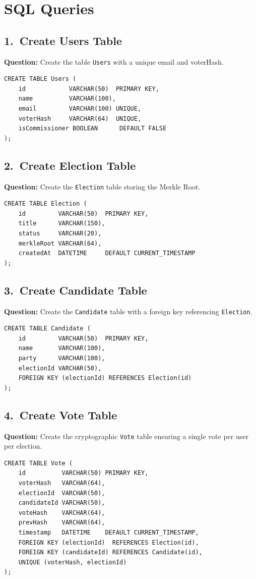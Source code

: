 \documentclass[12pt, a4paper]{article}
\begin{document}
\section{SQL Queries}

\subsection{1.\ Create Users Table}
\textbf{Question:} Create the table \texttt{Users} with a unique email and voterHash.
\begin{lstlisting}
CREATE TABLE Users (
    id            VARCHAR(50)  PRIMARY KEY,
    name          VARCHAR(100),
    email         VARCHAR(100) UNIQUE,
    voterHash     VARCHAR(64)  UNIQUE,
    isCommissioner BOOLEAN      DEFAULT FALSE
);
\end{lstlisting}

\subsection{2.\ Create Election Table}
\textbf{Question:} Create the \texttt{Election} table storing the Merkle Root.
\begin{lstlisting}
CREATE TABLE Election (
    id         VARCHAR(50)  PRIMARY KEY,
    title      VARCHAR(150),
    status     VARCHAR(20),
    merkleRoot VARCHAR(64),
    createdAt  DATETIME     DEFAULT CURRENT_TIMESTAMP
);
\end{lstlisting}

\subsection{3.\ Create Candidate Table}
\textbf{Question:} Create the \texttt{Candidate} table with a foreign key referencing \texttt{Election}.
\begin{lstlisting}
CREATE TABLE Candidate (
    id         VARCHAR(50)  PRIMARY KEY,
    name       VARCHAR(100),
    party      VARCHAR(100),
    electionId VARCHAR(50),
    FOREIGN KEY (electionId) REFERENCES Election(id)
);
\end{lstlisting}

\subsection{4.\ Create Vote Table}
\textbf{Question:} Create the cryptographic \texttt{Vote} table ensuring a single vote per user per election.
\begin{lstlisting}
CREATE TABLE Vote (
    id          VARCHAR(50) PRIMARY KEY,
    voterHash   VARCHAR(64),
    electionId  VARCHAR(50),
    candidateId VARCHAR(50),
    voteHash    VARCHAR(64),
    prevHash    VARCHAR(64),
    timestamp   DATETIME    DEFAULT CURRENT_TIMESTAMP,
    FOREIGN KEY (electionId)  REFERENCES Election(id),
    FOREIGN KEY (candidateId) REFERENCES Candidate(id),
    UNIQUE (voterHash, electionId)
);
\end{lstlisting}
\end{document}
